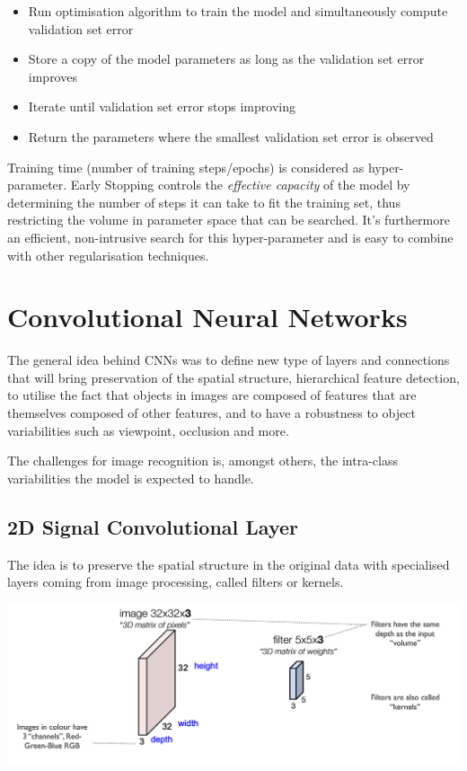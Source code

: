 \documentclass[11pt]{article}
\begin{document}
\begin{itemize}
	\item Run optimisation algorithm to train the model and simultaneously compute validation set error
	\item Store a copy of the model parameters as long as the validation set error improves
	\item Iterate until validation set error stops improving
	\item Return the parameters where the smallest validation set error is observed
\end{itemize}

Training time (number of training steps/epochs) is considered as hyper-parameter. Early Stopping controls the \emph{effective capacity} of the model by determining the number of steps it can take to fit the training set, thus restricting the volume in parameter space that can be searched. It's furthermore an efficient, non-intrusive search for this hyper-parameter and is easy to combine with other regularisation techniques.

\section{Convolutional Neural Networks}
The general idea behind CNNs was to define new type of layers and connections that will bring preservation of the spatial structure, hierarchical feature detection, to utilise the fact that objects in images are composed of features that are themselves composed of other features, and to have a robustness to object variabilities such as viewpoint, occlusion and more.

The challenges for image recognition is, amongst others, the intra-class variabilities the model is expected to handle.

\subsection{2D Signal Convolutional Layer}
The idea is to preserve the spatial structure in the original data with specialised layers coming from image processing, called filters or kernels.

\begin{center}
	\includegraphics[width=0.9\linewidth]{img/convolutional_layer_kernel}
\end{center}
\end{document}
